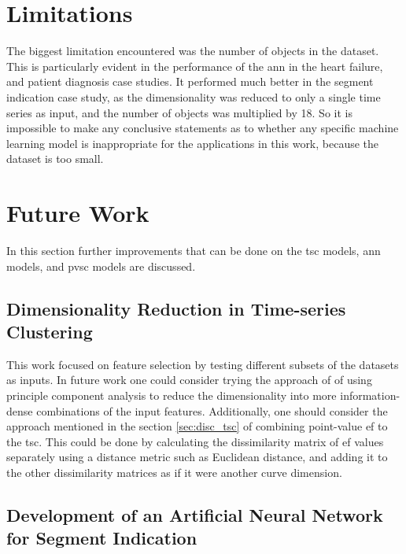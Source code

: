 \section{Limitations}

The biggest limitation encountered was the number of objects in the dataset. This is particularly evident in the performance of the \acrshort{ann} in the heart failure, and patient diagnosis case studies. It performed much better in the segment indication case study, as the dimensionality was reduced to only a single time series as input, and the number of objects was multiplied by 18. So it is impossible to make any conclusive statements as to whether any specific machine learning model is inappropriate for the applications in this work, because the dataset is too small. 

\section{Future Work}

In this section further improvements that can be done on the \acrshort{tsc} models, \acrshort{ann} models, and \acrshort{pvsc} models are discussed. 

\subsection*{Dimensionality Reduction in Time-series Clustering}

This work focused on feature selection by testing different subsets of the datasets as inputs. In future work one could consider trying the approach of \cite{hf_diagnosis_ml} of using principle component analysis to reduce the dimensionality into more information-dense combinations of the input features. Additionally, one should consider the approach mentioned in the section \ref{sec:disc_tsc} of combining point-value \acrshort{ef} to the \acrshort{tsc}. This could be done by calculating the dissimilarity matrix of \acrshort{ef} values separately using a distance metric such as Euclidean distance, and adding it to the other dissimilarity matrices as if it were another curve dimension.

\subsection*{Development of an Artificial Neural Network for Segment Indication}

